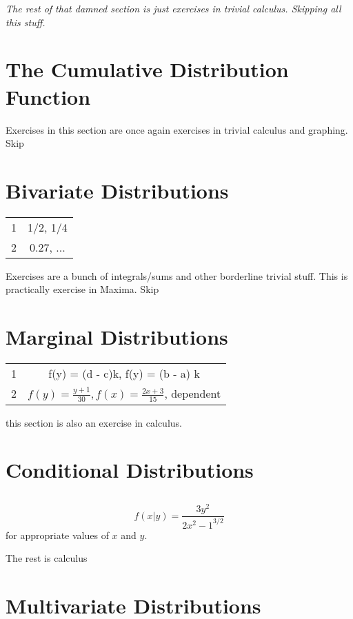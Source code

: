 \documentclass[11pt,oneside,titlepage]{book}
\begin{document}
\textit{The rest of that damned section is just exercises in trivial calculus. Skipping all
  this stuff.}

\section{The Cumulative Distribution Function}

Exercises in this section are once again exercises in trivial calculus and graphing. Skip

\section{Bivariate Distributions}

\begin{tabular}[center]{||c | c|| }
  \hline
  1 & 1/2, 1/4 \\
  2 & 0.27, ... \\  
  \hline 
\end{tabular}

Exercises are a bunch of integrals/sums and other borderline trivial stuff. This is practically
exercise in Maxima. Skip

\section{Marginal Distributions}

\begin{tabular}[center]{||c | c|| }
  \hline
  1 & f(y) = (d - c)k, f(y) = (b - a) k \\
  2 & $f(y) = \frac{y + 1}{30}, f(x) = \frac{2x + 3}{15}$, dependent \\
  \hline 
\end{tabular}

this section is also an exercise in calculus.

\section{Conditional Distributions}

\subsection{}

$$f(x|y) = \frac{3y^2}{2{x^2 - 1}^{3/2}}$$
for appropriate values of $x$ and $y$.

The rest is calculus

\section{Multivariate Distributions}
\end{document}
